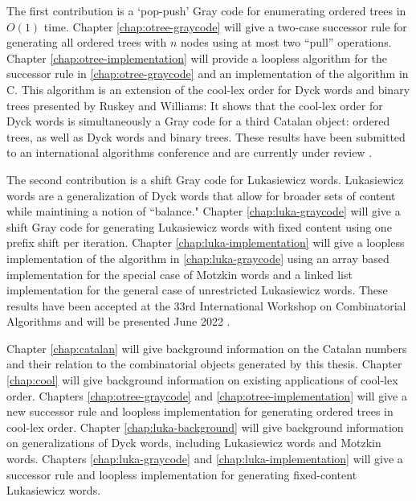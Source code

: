 The first contribution is a `pop-push' Gray code for enumerating ordered trees in $O(1)$ time. Chapter \ref{chap:otree-graycode} will give a two-case successor rule for generating all ordered trees with $n$ nodes using at most two ``pull'' operations. Chapter \ref{chap:otree-implementation} will provide a loopless algorithm for the successor rule in \ref{chap:otree-graycode} and an implementation of the algorithm in C.  This algorithm is an extension of the cool-lex order for Dyck words and binary trees presented by Ruskey and Williams: It shows that the cool-lex order for Dyck words is simultaneously a Gray code for a third Catalan object: ordered trees, as well as Dyck words and binary trees.  These results have been submitted to an international algorithms conference and are currently under review \cite{lapeypush}.

The second contribution is a shift Gray code for Lukasiewicz words.  Lukasiewicz words are a generalization of Dyck words that allow for broader sets of content while maintining a notion of ``balance." Chapter \ref{chap:luka-graycode} will give a shift Gray code for generating Lukasiewicz words with fixed content using one prefix shift per iteration.  Chapter \ref{chap:luka-implementation} will give a loopless implementation of the algorithm in \ref{chap:luka-graycode} using an array based implementation for the special case of Motzkin words and a linked list implementation for the general case of unrestricted Lukasiewicz words.  These results have been accepted at the 33rd International Workshop on Combinatorial Algorithms and will be presented June 2022 \cite{lapey2022shift}.

Chapter \ref{chap:catalan} will give background information on the Catalan numbers and their relation to the combinatorial objects generated by this thesis.  Chapter \ref{chap:cool} will give background information on existing applications of cool-lex order.  Chapters \ref{chap:otree-graycode} and \ref{chap:otree-implementation} will give a new successor rule and loopless implementation for generating ordered trees in cool-lex order.  Chapter \ref{chap:luka-background} will give background information on generalizations of Dyck words, including Lukasiewicz words and Motzkin words. Chapters \ref{chap:luka-graycode} and \ref{chap:luka-implementation} will give a successor rule and loopless implementation for generating fixed-content Lukasiewicz words.

